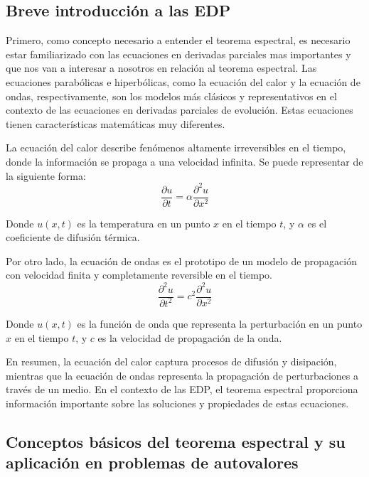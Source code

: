 \documentclass{article}
\begin{document}
    \subsection{Breve introducción a las EDP}
    Primero, como concepto necesario a entender el teorema espectral, es necesario estar familiarizado con las ecuaciones en derivadas parciales mas importantes y que nos van a interesar a nosotros en relación al teorema espectral.
    Las ecuaciones parabólicas e hiperbólicas, como la ecuación del calor y la ecuación de ondas, respectivamente, son los modelos más clásicos y representativos en el contexto de las ecuaciones en derivadas parciales de evolución. Estas ecuaciones tienen características matemáticas muy diferentes. 

    La ecuación del calor describe fenómenos altamente irreversibles en el tiempo, donde la información se propaga a una velocidad infinita. Se puede representar de la siguiente forma:
    \begin{equation}
        \frac{\partial u}{\partial t} = \alpha \frac{\partial^2 u}{\partial x^2}
        \end{equation}
    
    Donde $u(x,t)$ es la temperatura en un punto $x$ en el tiempo $t$, y $\alpha$ es el coeficiente de difusión térmica.

    Por otro lado, la ecuación de ondas es el prototipo de un modelo de propagación con velocidad finita y completamente reversible en el tiempo.
    \begin{equation}
        \frac{\partial^2 u}{\partial t^2} = c^2 \frac{\partial^2 u}{\partial x^2}
        \end{equation}
        
        Donde $u(x,t)$ es la función de onda que representa la perturbación en un punto $x$ en el tiempo $t$, y $c$ es la velocidad de propagación de la onda.

    En resumen, la ecuación del calor captura procesos de difusión y disipación, mientras que la ecuación de ondas representa la propagación de perturbaciones a través de un medio. En el contexto de las EDP, el teorema espectral proporciona información importante sobre las soluciones y propiedades de estas ecuaciones.
    \subsection{Conceptos básicos del teorema espectral y su aplicación en problemas de autovalores}
\end{document}
